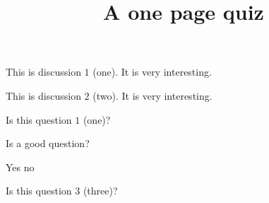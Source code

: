 \documentclass[onepage]{webquiztex}
\title{A one page quiz}
\begin{document}
  \begin{discussion}
        This is discussion $1$ (one). It is very interesting.
  \end{discussion}
  \begin{discussion}
     This is discussion $2$ (two). It is very interesting.
  \end{discussion}
  \begin{question} Is this question $1$ (one)? \end{question}
  \begin{question} Is a good question?
    \begin{choice}\correct Yes \incorrect no\end{choice}
  \end{question}
  \begin{question} Is this question $3$ (three)? \end{question}
\end{document}
